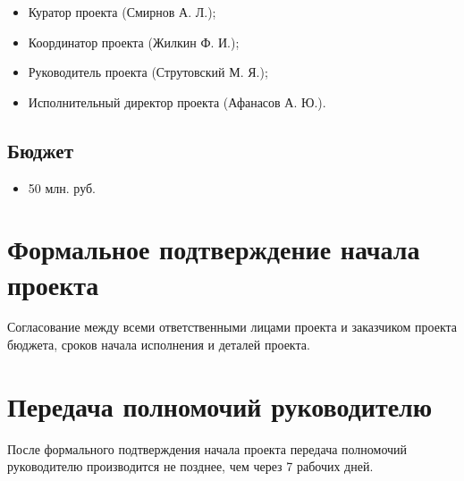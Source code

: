 \documentclass[a4paper,8pt]{article}
\begin{document}
    \begin{itemize}
        \item Куратор проекта (Смирнов А. Л.);
        \item Координатор проекта (Жилкин Ф. И.);
        \item Руководитель проекта (Струтовский М. Я.);
        \item Исполнительный директор проекта (Афанасов А. Ю.).
    \end{itemize}

\subsection*{Бюджет}

    \begin{itemize}
        \item 50 млн. руб.
    \end{itemize}


\section*{Формальное подтверждение начала проекта}

    Согласование между всеми ответственными лицами проекта и заказчиком проекта бюджета, сроков начала исполнения и деталей проекта.

\section*{Передача полномочий руководителю}

    После формального подтверждения начала проекта передача полномочий руководителю производится не позднее, чем через 7 рабочих дней.
\end{document}
